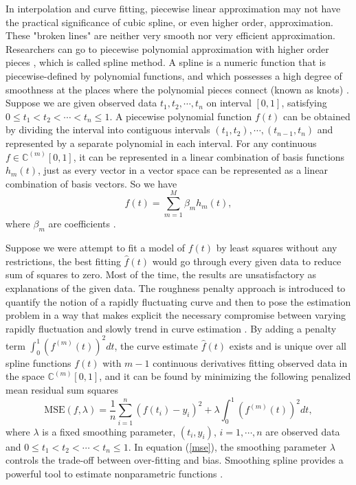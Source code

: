 In interpolation and curve fitting, piecewise linear approximation may not have the practical significance of cubic spline, or even higher order, approximation. These "broken lines" are neither very smooth nor very efficient approximation. Researchers can go to piecewise polynomial approximation with higher order pieces \cite{de1978practical}, which is called spline method. A spline is a numeric function that is piecewise-defined by polynomial functions, and which possesses a high degree of smoothness at the places where the polynomial pieces connect (known as knots) \cite{judd1998numerical}\cite{chen2009feedback}. Suppose we are given observed data $t_1,t_2, \cdots, t_n$ on interval $[0,1]$, satisfying $0\leq t_1< t_2 < \cdots <t_n \leq 1$. A piecewise polynomial function $f(t)$ can be obtained by dividing the interval into contiguous intervals $(t_1,t_2),\cdots,(t_{n-1},t_n)$ and represented by a separate polynomial in each interval. For any continuous $f\in \mathbb{C}^{(m)}[0,1]$, it can be represented in a linear combination of basis functions $h_m(t)$, just as every vector in a vector space can be represented as a linear combination of basis vectors. So we have
\begin{equation}\label{fbasis}
f(t) =\sum_{m=1}^{M}\beta_mh_m(t),
\end{equation}
where $\beta_m$ are coefficients \cite{ellis2009}. 

Suppose we were attempt to fit a model of $f(t)$ by least squares without any restrictions, the best fitting $\hat{f}(t)$ would go through every given data to reduce sum of squares to zero. Most of the time, the results are unsatisfactory as explanations of the given data. The roughness penalty approach is introduced to quantify the notion of a rapidly fluctuating curve and then to pose the estimation problem in a way that makes explicit the necessary compromise between varying rapidly fluctuation and slowly trend in curve estimation \cite{green1993nonparametric}. By adding a penalty term $\int_{0}^{1}(f^{(m)}(t))^2dt$, the curve estimate $\hat{f}(t)$ exists and is unique over all spline functions $f(t)$ with $m-1$ continuous derivatives fitting observed data in the space $\mathbb{C}^{(m)}[0,1]$, and it can be found by minimizing the following penalized mean residual sum  squares
\begin{equation}\label{mse}
\text{MSE}(f,\lambda)=\frac{1}{n}\sum_{i=1}^n(f(t_i)-y_i)^2+\lambda \int_{0}^{1}(f^{(m)}(t))^2dt,
\end{equation}
where $\lambda$ is a fixed smoothing parameter, $(t_i,y_i)$, $i=1, \cdots, n$ are observed data and $0 \leq t_1< t_2 < \cdots <t_n \leq 1$. In equation (\ref{mse}),  the smoothing parameter $\lambda$ controls the trade-off between over-fitting and bias. Smoothing spline provides a powerful tool to estimate nonparametric functions \cite{hastie1990generalized}. 

